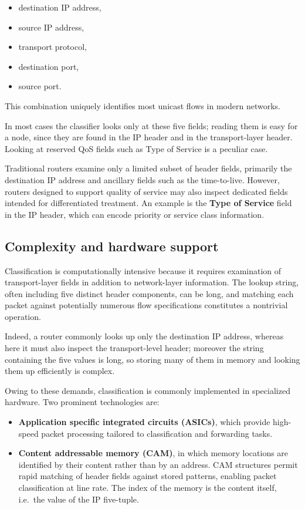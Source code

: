 \begin{itemize}
\item destination IP address,
\item source IP address,
\item transport protocol,
\item destination port,
\item source port.
\end{itemize}

This combination uniquely identifies most unicast flows in modern networks.

In most cases the classifier looks only at these five fields; reading them is easy for a node, since they are found in the IP header and in the transport-layer header. Looking at reserved QoS fields such as Type of Service is a peculiar case.

Traditional routers examine only a limited subset of header fields, primarily the destination IP address and ancillary fields such as the time-to-live. However, routers designed to support quality of service may also inspect dedicated fields intended for differentiated treatment. An example is the \textbf{Type of Service} field in the IP header, which can encode priority or service class information.

\subsection{Complexity and hardware support}

Classification is computationally intensive because it requires examination of transport-layer fields in addition to network-layer information. The lookup string, often including five distinct header components, can be long, and matching each packet against potentially numerous flow specifications constitutes a nontrivial operation.

Indeed, a router commonly looks up only the destination IP address, whereas here it must also inspect the transport-level header; moreover the string containing the five values is long, so storing many of them in memory and looking them up efficiently is complex.

Owing to these demands, classification is commonly implemented in specialized hardware. Two prominent technologies are:

\begin{itemize}
\item \textbf{Application specific integrated circuits (ASICs)}, which provide high-speed packet processing tailored to classification and forwarding tasks.
\item \textbf{Content addressable memory (CAM)}, in which memory locations are identified by their content rather than by an address. CAM structures permit rapid matching of header fields against stored patterns, enabling packet classification at line rate. The index of the memory is the content itself, i.e.\ the value of the IP five-tuple.
\end{itemize}

